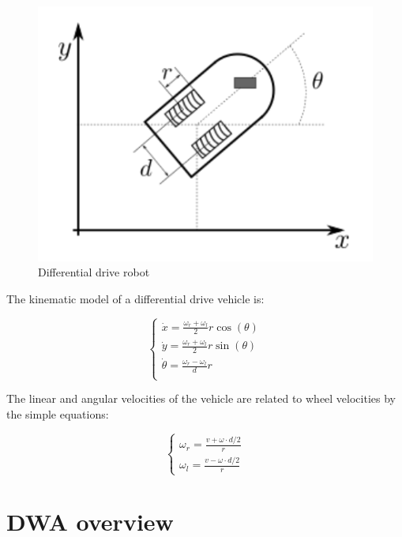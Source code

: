 \documentclass[11pt,a4paper]{article}
\begin{document}
\begin{figure}[H]
    \centering
    \includegraphics[scale=0.4]{other/differential_drive.png}
    \caption{Differential drive robot}
\end{figure}

The kinematic model of a differential drive vehicle is:

$$
\begin{cases}
    \dot{x} = \frac{\omega_r + \omega_l}{2} r \cos(\theta) \\
    \dot{y} = \frac{\omega_r + \omega_l}{2} r \sin(\theta) \\
    \dot{\theta} = \frac{\omega_r - \omega_l}{d} r \\
\end{cases}
$$

The linear and angular velocities of the vehicle are related to wheel velocities by the simple equations:

$$
\begin{cases}
    \omega_r = {\frac {v + \omega \cdot d/2}{r}} \\
    \omega_l = {\frac {v - \omega \cdot d/2}{r}}
\end{cases}
$$





\section{DWA overview}
\end{document}
